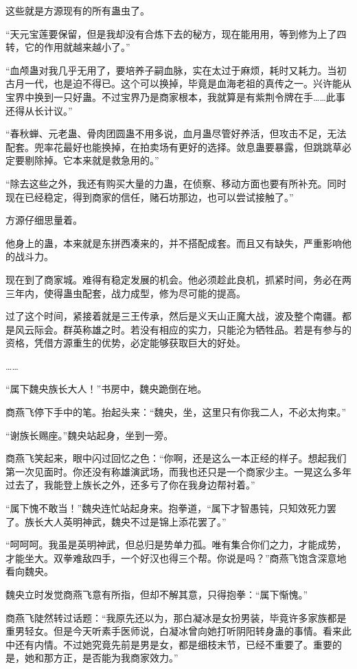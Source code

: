 \begin{this_body}
这些就是方源现有的所有蛊虫了。

“天元宝莲要保留，但是我却没有合炼下去的秘方，现在能用用，等到修为上了四转，它的作用就越来越小了。”

“血颅蛊对我几乎无用了，要培养子嗣血脉，实在太过于麻烦，耗时又耗力。当初古月一代，也是迫不得已。这个可以换掉，毕竟是血海老祖的真传之一。兴许能从宝界中换到一只好蛊。不过宝界乃是商家根本，我就算是有紫荆令牌在手……此事还得从长计议。”

“春秋蝉、元老蛊、骨肉团圆蛊不用多说，血月蛊尽管好养活，但攻击不足，无法配套。兜率花最好也能换掉，在拍卖场有更好的选择。敛息蛊要暴露，但跳跳草必定要剔除掉。它本来就是救急用的。”

“除去这些之外，我还有购买大量的力蛊，在侦察、移动方面也要有所补充。同时现在已经稳定，得到商家的信任，赌石坊那边，也可以尝试接触了。”

方源仔细思量着。

他身上的蛊，本来就是东拼西凑来的，并不搭配成套。而且又有缺失，严重影响他的战斗力。

现在到了商家城。难得有稳定发展的机会。他必须趁此良机，抓紧时间，务必在两三年内，使得蛊虫配套，战力成型，修为尽可能的提高。

过了这个时间，紧接着就是三王传承，然后是义天山正魔大战，波及整个南疆。都是风云际会。群英称雄之时。若没有相应的实力，只能沦为牺牲品。若是有参与的资格，凭借方源重生的优势，必定能够获取巨大的好处。

……

“属下魏央族长大人！”书房中，魏央跪倒在地。

商燕飞停下手中的笔。抬起头来：“魏央，坐，这里只有你我二人，不必太拘束。”

“谢族长赐座。”魏央站起身，坐到一旁。

商燕飞笑起来，眼中闪过回忆之色：“你啊，还是这么一本正经的样子。想起我们第一次见面时。你还没有称雄演武场，而我也还只是一个商家少主。一晃这么多年过去了，我能登上族长之外，还多亏了你在我身边帮衬着。”

“属下愧不敢当！”魏央连忙站起身来。抱拳道，“属下才智愚钝，只知效死力罢了。族长大人英明神武，魏央不过是锦上添花罢了。”

“呵呵呵。我虽是英明神武，但总归是势单力孤。唯有集合你们之力，才能成势，才能坐大。双拳难敌四手，一个好汉也得三个帮。你说是吗？”商燕飞饱含深意地看向魏央。

魏央立时发觉商燕飞意有所指，但却不解其意，只得抱拳：“属下惭愧。”

商燕飞陡然转过话题：“我原先还以为，那白凝冰是女扮男装，毕竟许多家族都是重男轻女。但是今天听素手医师说，白凝冰曾向她打听阴阳转身蛊的事情。看来此中还有内情。不过她究竟先前是男是女，都是细枝末节，已经不重要了。重要的是，她和那方正，是否能为我商家效力。”


\end{this_body}
